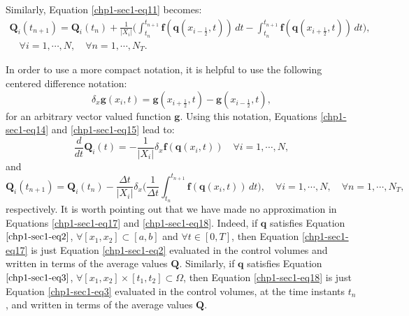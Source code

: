 Similarly, Equation \eqref{chp1-sec1-eq11} becomes:
\begin{equation}
        \label{chp1-sec1-eq15}
	\begin{aligned}
		\mathbf{Q}_i(t_{n+1}) =  \mathbf{Q}_i(t_n) +
		\frac{1}{|X_i|}\bigg( \int_{t_n}^{t_{n+1}}
        	\mathbf{f}(\mathbf{q}(x_{i-\frac{1}{2}}, t)) \,dt -
		\int_{t_n}^{t_{n+1}}\mathbf{f}(\mathbf{q}(x_{i+\frac{1}{2}}, t)) \,dt \bigg),
       		\\
		\quad \forall i = 1, \cdots, N,
		\quad \forall n = 1, \cdots, N_T.
	\end{aligned}
\end{equation}

In order to use a more compact notation, it is helpful to use the following centered difference notation:
\begin{equation}
	\label{chp1-sec1-eq16}
	\delta_x \mathbf{g}(x_i,t) = 
	\mathbf{g}(x_{i+\frac{1}{2}},t) - 
	\mathbf{g}(x_{i-\frac{1}{2}},t),
\end{equation}
for an arbitrary vector valued function $\mathbf{g}$. 
Using this notation, Equations \eqref{chp1-sec1-eq14}
and \eqref{chp1-sec1-eq15} lead to:
\begin{equation}
        \label{chp1-sec1-eq17}
        \frac{d}{dt} \mathbf{Q}_i(t) = -\frac{1}{|X_i|}
	\delta_x \mathbf{f}(\mathbf{q}(x_{i},t))
        \quad \forall i = 1, \cdots, N,
\end{equation}
and
\begin{equation}
        \label{chp1-sec1-eq18}
        \mathbf{Q}_i(t_{n+1}) =  \mathbf{Q}_i(t_n) -
	\frac{\Delta t}{|X_i|} \delta _x\bigg( \frac{1}{\Delta t}\int_{t_n}^{t_{n+1}}
        \mathbf{f}(\mathbf{q}(x_{i}, t)) \,dt \bigg),
        \quad \forall i = 1, \cdots, N,
        \quad \forall n = 1, \cdots, N_T,
\end{equation}
respectively.
It is worth pointing out that we have made no approximation in Equations
\eqref{chp1-sec1-eq17} and \eqref{chp1-sec1-eq18}. Indeed, if $\mathbf{q}$ satisfies Equation
$\eqref{chp1-sec1-eq2}$, $\forall [x_1, x_2] \subset [a,b]$ and $\forall t \in [0,T]$,
then Equation \eqref{chp1-sec1-eq17} is just Equation
\eqref{chp1-sec1-eq2} evaluated in the control volumes and written
in terms of the average values $\mathbf{Q}$. 
Similarly, if $\mathbf{q}$ satisfies Equation
$\eqref{chp1-sec1-eq3}$, $\forall [x_1, x_2] \times [t_1, t_2] \subset \Omega$,
then Equation \eqref{chp1-sec1-eq18} is just Equation
\eqref{chp1-sec1-eq3} evaluated in the control volumes,
at the time instants $t_n$, and written
in terms of the average values $\mathbf{Q}$.

